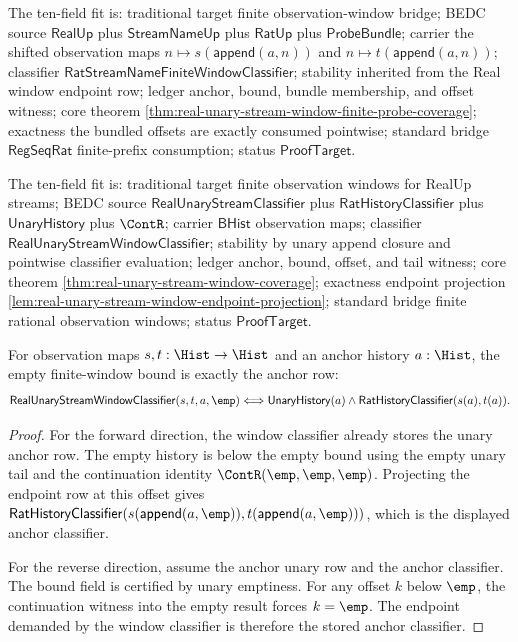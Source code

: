The ten-field fit is: traditional target finite observation-window bridge;
BEDC source $\mathsf{RealUp}$ plus $\mathsf{StreamNameUp}$ plus
$\mathsf{RatUp}$ plus $\mathsf{ProbeBundle}$; carrier the shifted observation
maps $n\mapsto s(\mathsf{append}(a,n))$ and
$n\mapsto t(\mathsf{append}(a,n))$; classifier
$\mathsf{RatStreamNameFiniteWindowClassifier}$; stability inherited from the
Real window endpoint row; ledger anchor, bound, bundle membership, and offset
witness; core theorem
\autoref{thm:real-unary-stream-window-finite-probe-coverage}; exactness the
bundled offsets are exactly consumed pointwise; standard bridge
$\mathsf{RegSeqRat}$ finite-prefix consumption; status $\mathsf{ProofTarget}$.

The ten-field fit is: traditional target finite observation windows for RealUp
streams; BEDC source $\mathsf{RealUnaryStreamClassifier}$ plus
$\mathsf{RatHistoryClassifier}$ plus $\mathsf{UnaryHistory}$ plus $\ContR$;
carrier $\mathsf{BHist}$ observation maps; classifier
$\mathsf{RealUnaryStreamWindowClassifier}$; stability by unary append closure
and pointwise classifier evaluation; ledger anchor, bound, offset, and tail
witness; core theorem \autoref{thm:real-unary-stream-window-coverage};
exactness endpoint projection
\autoref{lem:real-unary-stream-window-endpoint-projection}; standard bridge
finite rational observation windows; status $\mathsf{ProofTarget}$.

\begin{theorem}
\label{thm:real-unary-stream-window-empty-bound-iff}
For observation maps $s,t:\Hist\to\Hist$ and an anchor history $a:\Hist$,
the empty finite-window bound is exactly the anchor row:
$$
\mathsf{RealUnaryStreamWindowClassifier}(s,t,a,\emp)
\Longleftrightarrow
\mathsf{UnaryHistory}(a)\land \mathsf{RatHistoryClassifier}(s(a),t(a)).
$$
\end{theorem}
\begin{proof}
For the forward direction, the window classifier already stores the unary anchor
row. The empty history is below the empty bound using the empty unary tail and
the continuation identity $\ContR(\emp,\emp,\emp)$. Projecting the endpoint row
at this offset gives
$\mathsf{RatHistoryClassifier}(s(\mathsf{append}(a,\emp)),
t(\mathsf{append}(a,\emp)))$, which is the displayed anchor classifier.

For the reverse direction, assume the anchor unary row and the anchor
classifier. The bound field is certified by unary emptiness. For any offset
$k$ below $\emp$, the continuation witness into the empty result forces
$k=\emp$. The endpoint demanded by the window classifier is therefore the
stored anchor classifier.
\end{proof}

